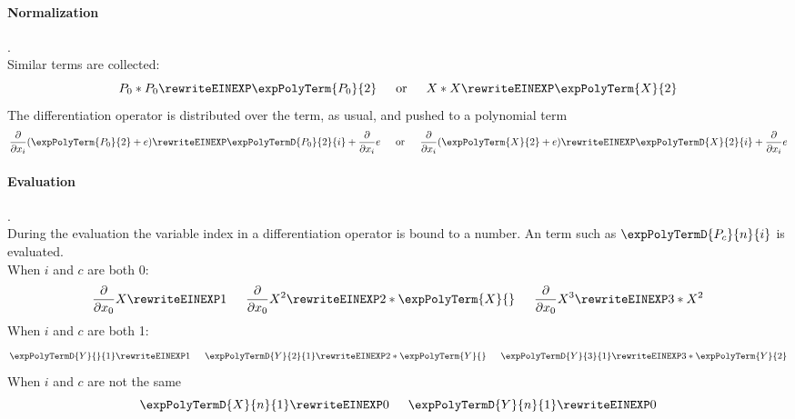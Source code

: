 \paragraph{Normalization}.\\
Similar terms are collected:\\
$$P_0*P_0\rewriteEINEXP \expPolyTerm{P_0}{2} \indent \text{or}\indent X*X\rewriteEINEXP \expPolyTerm{X}{2} $$ 
The differentiation operator is distributed over the \name{} term, as usual,  and pushed to a polynomial term\\
 $$\frac{\partial}{\partial x_i} (\expPolyTerm{P_0}{2}+e) \rewriteEINEXP \expPolyTermD{P_0}{2}{i} + \frac{\partial}{\partial x_i}  e
 \indent \text{or}\indent
 \frac{\partial}{\partial x_i} (\expPolyTerm{X}{2}+e) \rewriteEINEXP \expPolyTermD{X}{2}{i} +\frac{\partial}{\partial x_i}  e
 $$


\paragraph{Evaluation}.\\
During the evaluation the variable index in a differentiation operator is bound to a number.
An \name{} term such as $\expPolyTermD{P_c}{n}{i}$ is evaluated.\\
When $i$ and $c$ are both 0:\\ 
$$\frac{\partial}{\partial x_0} X \rewriteEINEXP  1 
 \indent  \frac{\partial}{\partial x_0} X^2 \rewriteEINEXP  2*\expPolyTerm{X}{}  
  \indent \frac{\partial}{\partial x_0} X^3  \rewriteEINEXP  3*X^{2} $$ 
When $i$ and $c$ are both 1:\\ 
$$
\expPolyTermD{Y}{}{1} \rewriteEINEXP  1 
 \indent  \expPolyTermD{Y}{2}{1} \rewriteEINEXP  2*\expPolyTerm{Y}{}  
  \indent  \expPolyTermD{Y}{3}{1} \rewriteEINEXP  3*\expPolyTerm{Y}{2}  
   $$  
When $i$ and $c$ are not the same\\ 
$$ \expPolyTermD{X}{n}{1} \rewriteEINEXP  0 
\indent \expPolyTermD{Y}{n}{1} \rewriteEINEXP  0  $$ 
